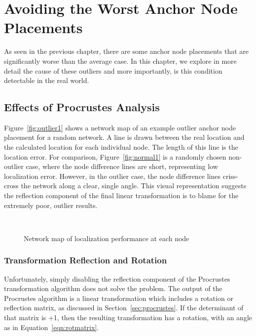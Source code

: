 \chapter{Avoiding the Worst Anchor Node Placements}
\label{chap:outliers}
As seen in the previous chapter, there are some anchor node placements that are significantly worse than the average case.   In this chapter, we explore in more detail the cause of these outliers and more importantly, is this condition detectable in the real world.

\section{Effects of Procrustes Analysis}

Figure~\ref{fig:outlier1} shows a network map of an example outlier anchor node placement for a random network. A line is drawn between the real location and the calculated location for each individual node.  The length of this line is the location error.  For comparison, Figure~\ref{fig:normal1} is a randomly chosen non-outlier case, where the node difference lines are short, representing low localization error.  However, in the outlier case, the node difference lines criss-cross the network along a clear, single angle.  This visual representation suggests the reflection component of the final linear transformation is to blame for the extremely poor, outlier results.

\begin{figure}
  \centering
\\
	\label{fig:outliernetworkdiff}
	\caption{Network map of localization performance at each node}
\end{figure}

\subsection{Transformation Reflection and Rotation}
\label{sec:reflection}
Unfortunately, simply disabling the reflection component of the Procrustes transformation algorithm does not solve the problem.  The output of the Procrustes algorithm is a linear transformation which includes a rotation or reflection matrix, as discussed in Section~\ref{sec:procrustes}.  If the determinant of that matrix is +1, then the resulting transformation has a rotation, with an angle as in Equation~\ref{eqn:rotmatrix}.  

